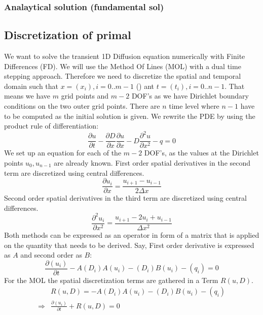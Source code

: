 \documentclass[10pt]{article}
\begin{document}
\subsubsection{Analaytical solution (fundamental sol)}
\subsection{Discretization of primal}
We want to solve the transient 1D Diffusion equation numerically with Finite Differences (FD). We will use the Method Of Lines (MOL) with a dual time stepping approach. Therefore we need to discretize the spatial and temporal domain such that $x=(x_i), i=0..m-1$ () ant $t=(t_i), i=0..n-1$. That means we have $m$ grid points and $m-2$ DOF's as we have Dirichlet boundary conditions on the two outer grid points. There are $n$ time level where $n-1$ have to be computed as the initial solution is given. We rewrite the PDE by using the product rule of differentiation:
\begin{equation}
\frac{\partial u}{\partial t} - \frac{\partial D}{\partial x}\frac{\partial u}{\partial x} -D \frac{\partial^2 u}{\partial x^2} - q = 0
\end{equation}
We set up an equation for each of the $m-2$ DOF's, as the values at the Dirichlet points $u_0, u_{n-1}$ are already known. First order spatial derivatives in the second term are discretized using central differences.
\begin{equation}
\frac{\partial u_i}{\partial x} = \frac{u_{i+1} - u_{i-1}}{2\Delta x}
\end{equation}
Second order spatial derivatives in the third term are discretized using central differences.
\begin{equation}
\frac{\partial^2 u_i}{\partial x^2} = \frac{u_{i+1} - 2 u_{i} + u_{i-1}}{\Delta x^2}
\end{equation}
Both methods can be expressed as an operator in form of a matrix that is applied on the quantity that needs to be derived. Say, First order derivative is expressed as $A$ and second order as $B$:
\begin{equation}
\frac{\partial (u_i)}{\partial t} - A(D_i)A(u_i) - (D_i) B(u_i) - (q_i) = 0
\end{equation}
For the MOL the spatial discretization terms are gathered in a Term $R(u,D)$.
\begin{align}
&R(u,D) = - A(D_i)A(u_i) - (D_i) B(u_i) - (q_i) \\
\Rightarrow & \frac{\partial (u_i)}{\partial t} + R(u,D) = 0
\end{align}
\end{document}
